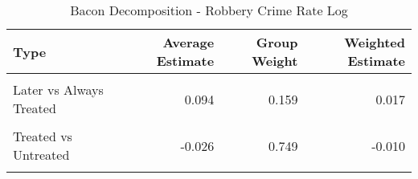 \begin{table}[H]

\caption{\label{tab:tab:bacondecompositionRobbery}Bacon Decomposition - Robbery Crime Rate Log}
\centering
\begin{tabular}[t]{lrrr}
\toprule
Type & Average Estimate & Group Weight & Weighted Estimate\\
\midrule
\cellcolor{gray!6}{Earlier vs Later Treated} & \cellcolor{gray!6}{0.096} & \cellcolor{gray!6}{0.068} & \cellcolor{gray!6}{0.007}\\
Later vs Always Treated & 0.094 & 0.159 & 0.017\\
\cellcolor{gray!6}{Later vs Earlier Treated} & \cellcolor{gray!6}{0.151} & \cellcolor{gray!6}{0.023} & \cellcolor{gray!6}{0.002}\\
Treated vs Untreated & -0.026 & 0.749 & -0.010\\
\cellcolor{gray!6}{Total TWFE} & \cellcolor{gray!6}{NaN} & \cellcolor{gray!6}{NaN} & \cellcolor{gray!6}{0.017}\\
\bottomrule
\end{tabular}
\end{table}

